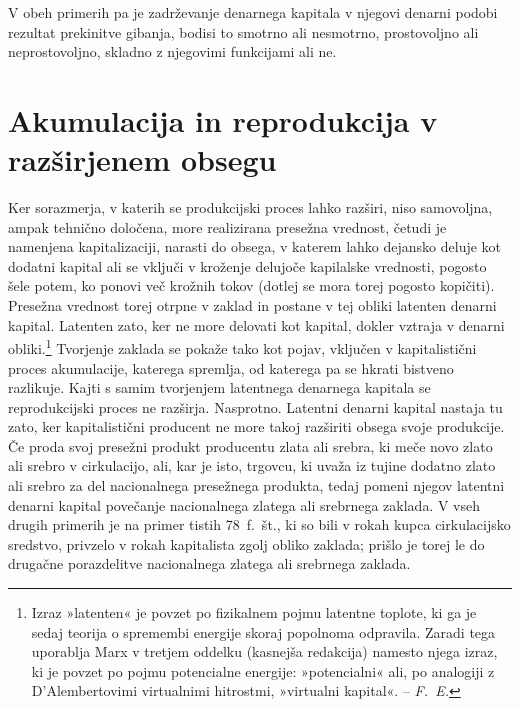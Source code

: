 \documentclass[kapital_02.tex]{subfiles}
\begin{document}
V obeh primerih pa je zadrževanje denarnega kapitala v njegovi denarni podobi rezultat prekinitve gibanja, bodisi to smotrno ali nesmotrno, prostovoljno ali neprostovoljno, skladno z njegovimi funkcijami ali ne.

\section{Akumulacija in reprodukcija v razširjenem obsegu}

\renewcommand*{\thefootnote}{6\alph{footnote}}
\setcounter{footnote}{0}
Ker sorazmerja, v katerih se produkcijski proces lahko razširi, niso samovoljna, ampak tehnično določena, more realizirana presežna vrednost, četudi je namenjena kapitalizaciji, narasti do obsega, v katerem lahko dejansko deluje kot \KPEstran dodatni kapital ali se vključi v kroženje delujoče kapilalske vrednosti, pogosto šele potem, ko ponovi več krožnih tokov (dotlej se mora torej pogosto kopičiti). Presežna vrednost torej otrpne v zaklad in postane v tej obliki latenten denarni kapital. Latenten zato, ker ne more delovati kot kapital, dokler vztraja v denarni obliki.\footnote{Izraz »latenten« je povzet po fizikalnem pojmu latentne toplote, ki ga je sedaj teorija o spremembi energije skoraj popolnoma odpravila. Zaradi tega uporablja Marx v tretjem oddelku (kasnejša redakcija) namesto njega izraz, ki je povzet po pojmu potencialne energije: »potencialni« ali, po analogiji z D'Alembertovimi virtualnimi hitrostmi, »virtualni kapital«. -- \emph{F.\ E.}} Tvorjenje zaklada se pokaže tako kot pojav, vključen v kapitalistični proces akumulacije, katerega spremlja, od katerega pa se hkrati bistveno razlikuje. Kajti s samim tvorjenjem latentnega denarnega kapitala se reprodukcijski proces ne razširja. Nasprotno. Latentni denarni kapital nastaja tu zato, ker kapitalistični producent ne more takoj razširiti obsega svoje produkcije. Če proda svoj presežni produkt producentu zlata ali srebra, ki meče novo zlato ali srebro v cirkulacijo, ali, kar je isto, trgovcu, ki uvaža iz tujine dodatno zlato ali srebro za del nacionalnega presežnega produkta, tedaj pomeni njegov latentni denarni kapital povečanje nacionalnega zlatega ali srebrnega zaklada. V vseh drugih primerih je na primer tistih 78\ f.\ št., ki so bili v rokah kupca cirkulacijsko sredstvo, privzelo v rokah kapitalista zgolj obliko zaklada; prišlo je torej le do drugačne porazdelitve nacionalnega zlatega ali srebrnega zaklada.
\renewcommand*{\thefootnote}{\arabic{footnote}}
\setcounter{footnote}{6}
\end{document}

